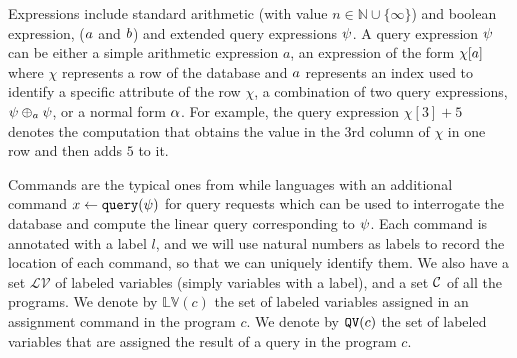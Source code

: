 Expressions include
standard arithmetic (with value $n \in \mathbb{N}\cup \{ \infty \}$) and boolean expression, ($a$ and $b$) and extended query expressions $\psi$.
A query expression $\psi$ can be either a simple arithmetic expression $a$, an expression of the form $\chi[a]$ where $\chi$ represents a row of the database  and  $a$ represents an index used to identify a specific attribute of the row $\chi$, a combination of two query expressions, $\psi \oplus_{a} \psi$, or a normal form $\alpha$.
For example, the query expression $\chi[3] + 5$  denotes the computation that
obtains
the value in the $3$rd column of $\chi$ in one row and then adds $5$ to it.

Commands are the typical ones from while languages with an additional command $\mathrel{ x \leftarrow {\tt query}(\psi) }$ for query requests which can be used to interrogate
 the database and compute the linear query corresponding to $\psi$.
Each command is annotated with a label $l$, and we will use natural numbers as labels to record
the location of each command, so that we can uniquely identify them.
We also have a set $\mathcal{LV}$  of labeled variables (simply variables with a label), and a set $\mathcal{C}$ of all the programs.
We denote by $\mathbb{LV}(c)$ the set of labeled variables assigned in an assignment command in the program $c$.  
We denote by  $\mathtt{QV}(c)$ the set of labeled variables that are assigned the result of a query in the program $c$. 




